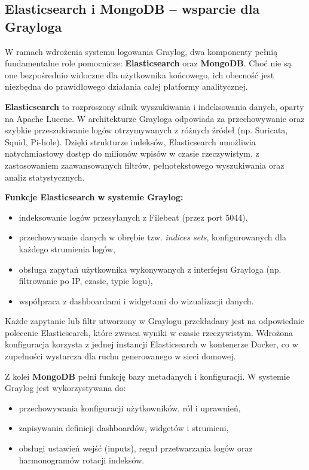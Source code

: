 \documentclass[
    left=2.5cm,         %
    right=2.5cm,        %
    top=2.5cm,          %
    bottom=3cm,         %
    bindingoffset=6mm,  %
    nohyphenation=true %
]{eiti/eiti-thesis} %
\begin{document}
\subsection{Elasticsearch i MongoDB – wsparcie dla Grayloga}

W ramach wdrożenia systemu logowania Graylog, dwa komponenty pełnią fundamentalne role pomocnicze: \textbf{Elasticsearch} oraz \textbf{MongoDB}. Choć nie są one bezpośrednio widoczne dla użytkownika końcowego, ich obecność jest niezbędna do prawidłowego działania całej platformy analitycznej.

\textbf{Elasticsearch} to rozproszony silnik wyszukiwania i indeksowania danych, oparty na Apache Lucene. W architekturze Grayloga odpowiada za przechowywanie oraz szybkie przeszukiwanie logów otrzymywanych z różnych źródeł (np. Suricata, Squid, Pi-hole). Dzięki strukturze indeksów, Elasticsearch umożliwia natychmiastowy dostęp do milionów wpisów w czasie rzeczywistym, z zastosowaniem zaawansowanych filtrów, pełnotekstowego wyszukiwania oraz analiz statystycznych.

\textbf{Funkcje Elasticsearch w systemie Graylog:}
\begin{itemize}
    \item indeksowanie logów przesyłanych z Filebeat (przez port 5044),
    \item przechowywanie danych w obrębie tzw. \textit{indices sets}, konfigurowanych dla każdego strumienia logów,
    \item obsługa zapytań użytkownika wykonywanych z interfejsu Grayloga (np. filtrowanie po IP, czasie, typie logu),
    \item współpraca z dashboardami i widgetami do wizualizacji danych.
\end{itemize}

Każde zapytanie lub filtr utworzony w Graylogu przekładany jest na odpowiednie polecenie Elasticsearch, które zwraca wyniki w czasie rzeczywistym. Wdrożona konfiguracja korzysta z jednej instancji Elasticsearch w kontenerze Docker, co w zupełności wystarcza dla ruchu generowanego w sieci domowej.

Z kolei \textbf{MongoDB} pełni funkcję bazy metadanych i konfiguracji. W systemie Graylog jest wykorzystywana do:
\begin{itemize}
    \item przechowywania konfiguracji użytkowników, ról i uprawnień,
    \item zapisywania definicji dashboardów, widgetów i strumieni,
    \item obsługi ustawień wejść (inputs), reguł przetwarzania logów oraz harmonogramów rotacji indeksów.
\end{itemize}
\end{document}
